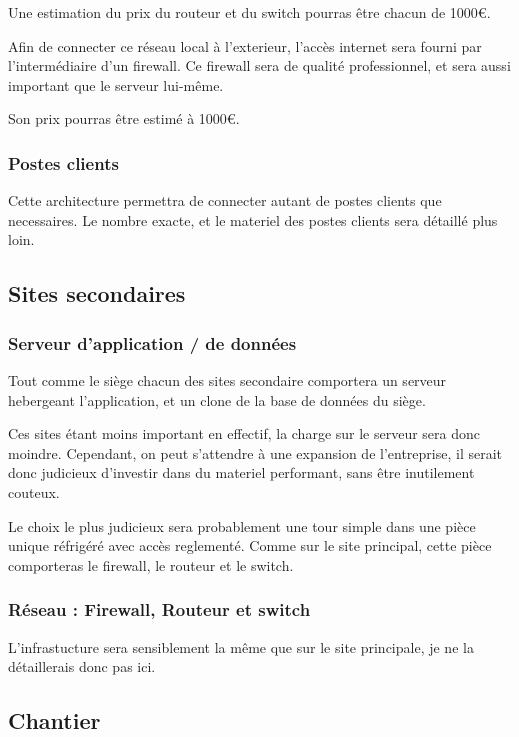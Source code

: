             Une estimation du prix du routeur et du switch pourras être chacun de 1000€.
            
            Afin de connecter ce réseau local à l'exterieur, l'accès internet sera fourni par l'intermédiaire d'un firewall.
            Ce firewall sera de qualité professionnel, et sera aussi important que le serveur lui-même.
    
            Son prix pourras être estimé à 1000€.

        \subsubsection{Postes clients}
            Cette architecture permettra de connecter autant de postes clients que necessaires.
            Le nombre exacte, et le materiel des postes clients sera détaillé plus loin.

    \subsection{Sites secondaires}

        \subsubsection{Serveur d'application / de données}
            Tout comme le siège chacun des sites secondaire comportera un serveur hebergeant l'application, et un clone de la base de données du siège.

            Ces sites étant moins important en effectif, la charge sur le serveur sera donc moindre.
            Cependant, on peut s'attendre à une expansion de l'entreprise, il serait donc judicieux d'investir dans du materiel performant, sans être inutilement couteux.
            
            Le choix le plus judicieux sera probablement une tour simple dans une pièce unique réfrigéré avec accès reglementé.
            Comme sur le site principal, cette pièce comporteras le firewall, le routeur et le switch.

        \subsubsection{Réseau : Firewall, Routeur et switch}
            L'infrastucture sera sensiblement la même que sur le site principale, je ne la détaillerais donc pas ici.

    \subsection{Chantier}
                    
